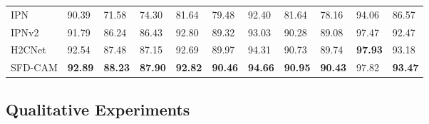 \documentclass[times, review, 10pt]{elsarticle}
\begin{document}
\begin{CJK}{UTF8}{gbsn}
\begin{table}[htb]
\begin{tabular}{lllllllllll}
IPN           & 90.39          & 71.58          & 74.30          & 81.64          & 79.48          & 92.40          & 81.64          & 78.16          & 94.06          & 86.57\textbf{} \\
IPNv2         & 91.79          & 86.24          & 86.43          & 92.80          & 89.32          & 93.03          & 90.28          & 89.08          & 97.47          & 92.47\textbf{} \\
H2CNet        & 92.54          & 87.48          & 87.15          & 92.69          & 89.97          & 94.31          & 90.73          & 89.74          & \textbf{97.93} & 93.18\textbf{} \\
SFD-CAM       & \textbf{92.89} & \textbf{88.23} & \textbf{87.90} & \textbf{92.82} & \textbf{90.46} & \textbf{94.66} & \textbf{90.95} & \textbf{90.43} & 97.82          & \textbf{93.47} \\
\bottomrule
\end{tabular}
\end{table}

\subsection{Qualitative Experiments}


\end{CJK}
\end{document}
